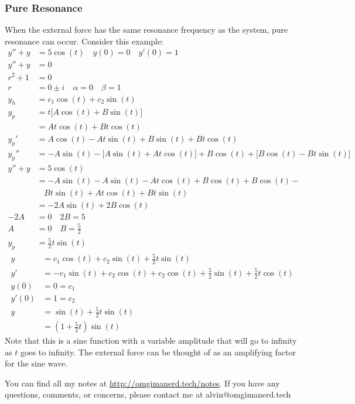 \documentclass{math}
\begin{document}
\subsubsection*{Pure Resonance}
When the external force has the same resonance frequency as the system, pure
resonance can occur. Consider this example:
\begin{align*}
  y''+y &= 5\cos(t) \quad y(0) = 0 \quad y'(0) = 1 \\
  y''+y &= 0 \\
  r^2+1 &= 0 \\
  r &= 0\pm i \quad \alpha = 0 \quad \beta = 1 \\
  y_h &= c_1\cos(t)+c_2\sin(t) \\
  y_p &= t\bigg[A\cos(t)+B\sin(t)\bigg] \\
  &= At\cos(t)+Bt\cos(t) \\
  y_p' &= A\cos(t)-At\sin(t)+B\sin(t)+Bt\cos(t) \\
  y_p'' &= -A\sin(t)-\bigg[A\sin(t)+At\cos(t)\bigg]+
    B\cos(t)+\bigg[B\cos(t)-Bt\sin(t)\bigg] \\
  y''+y &= 5\cos(t) \\
  &= -A\sin(t)-A\sin(t)-At\cos(t)+B\cos(t)+B\cos(t)- \\
  &~~~~ Bt\sin(t)+At\cos(t)+Bt\sin(t) \\
  &= -2A\sin(t)+2B\cos(t) \\
  -2A &= 0 \quad 2B = 5 \\
  A &= 0 \quad B = \frac{5}{2} \\
  y_p &= \frac{5}{2}t\sin(t)
\end{align*}
\begin{align*}
  y &= c_1\cos(t)+c_2\sin(t)+\frac{5}{2}t\sin(t) \\
  y' &=
    -c_1\sin(t)+c_2\cos(t)+c_2\cos(t)+\frac{5}{2}\sin(t)+\frac{5}{2}t\cos(t) \\
  y(0) &= 0 = c_1 \\
  y'(0) &= 1 = c_2 \\
  y &= \sin(t)+\frac{5}{2}t\sin(t) \\
  &= (1+\frac{5}{2}t)\sin(t)
\end{align*}
Note that this is a sine function with a variable amplitude that will go to
infinity as \( t \) goes to infinity. The external force can be thought of as
an amplifying factor for the sine wave.

\begin{center}
  You can find all my notes at \url{http://omgimanerd.tech/notes}. If you have
  any questions, comments, or concerns, please contact me at
  alvin@omgimanerd.tech
\end{center}
\end{document}
